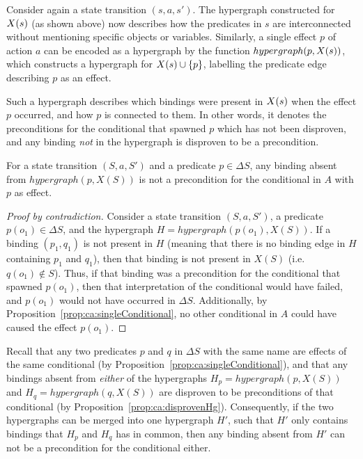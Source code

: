 \documentclass[../Master.tex]{subfiles}
\begin{document}
Consider again a state transition $\left( s, a, s' \right)$. The hypergraph constructed for $X(s)$ (as shown above) now describes how the predicates in $s$ are interconnected without mentioning specific objects or variables. Similarly, a single effect $p$ of action $a$ can be encoded as a hypergraph by the function $hypergraph(p,X(s))$, which constructs a hypergraph for $X(s) \cup \{p\}$, labelling the predicate edge describing $p$ as an effect.

Such a hypergraph describes which bindings were present in $X(s)$ when the effect $p$ occurred, and how $p$ is connected to them. In other words, it denotes the preconditions for the conditional that spawned $p$ which has not been disproven, and any binding \textit{not} in the hypergraph is disproven to be a precondition.

\begin{proposition}\label{prop:ca:disprovenHg}
    For a state transition $\left( S, a, S' \right)$ and a predicate $p \in \Delta S$, any binding absent from $hypergraph \left( p, X(S) \right)$ is not a precondition for the conditional in $A$ with $p$ as effect. 
\end{proposition}

\begin{proof}[Proof by contradiction]
    Consider a state transition $\left( S, a, S' \right)$, a predicate $p \left( o_1 \right) \in \Delta S$, and the hypergraph $H = hypergraph\left( p\left(o_1\right), X(S) \right)$. If a binding $(p_1, q_1)$ is not present in $H$ (meaning that there is no binding edge in $H$ containing $p_1$ and $q_1$), then that binding is not present in $X(S)$ (i.e.\ $q\left(o_1\right) \notin S$). Thus, if that binding was a precondition for the conditional that spawned $p\left(o_1\right)$, then that interpretation of the conditional would have failed, and $p\left( o_1 \right)$ would not have occurred in $\Delta S$. Additionally, by Proposition~\ref{prop:ca:singleConditional}, no other conditional in $A$ could have caused the effect $p \left(o_1\right)$.
\end{proof}

Recall that any two predicates $p$ and $q$ in $\Delta S$ with the same name are effects of the same conditional (by Proposition~\ref{prop:ca:singleConditional}), and that any bindings absent from \textit{either} of the hypergraphs $H_p = hypergraph(p, X(S))$ and $H_q = hypergraph(q, X(S))$ are disproven to be preconditions of that conditional (by Proposition~\ref{prop:ca:disprovenHg}). Consequently, if the two hypergraphs can be merged into one hypergraph $H'$, such that $H'$ only contains bindings that $H_p$ and $H_q$ has in common, then any binding absent from $H'$ can not be a precondition for the conditional either. 
\end{document}
